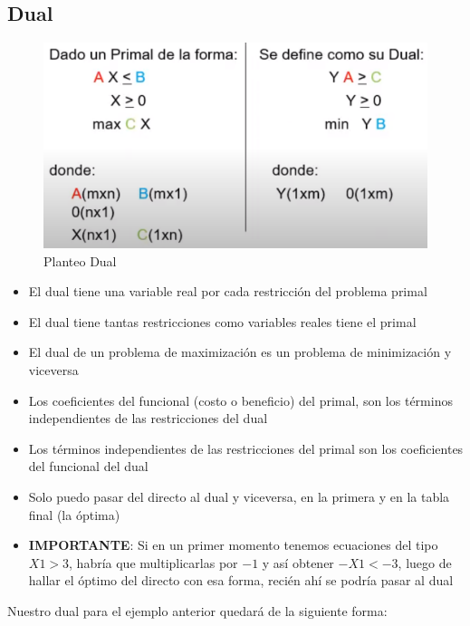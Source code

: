 \documentclass[titlepage,a4paper]{article}
\begin{document}
\subsection{Dual}

\begin{figure}[H]
    \centering
    \includegraphics[scale=0.4]{planteo_dual.png}
    \caption{Planteo Dual}
\end{figure}

\begin{itemize}
    \item El dual tiene una variable real por cada restricción del problema primal
    \item El dual tiene tantas restricciones como variables reales tiene el primal
    \item El dual de un problema de maximización es un problema de minimización y viceversa
    \item Los coeficientes del funcional (costo o beneficio) del primal, son los términos independientes de las restricciones del dual
    \item Los términos independientes de las restricciones del primal son los coeficientes del funcional del dual
    \item Solo puedo pasar del directo al dual y viceversa, en la primera y en la tabla final (la óptima)
    \item \textbf{IMPORTANTE}: Si en un primer momento tenemos ecuaciones del tipo $X1 > 3$, habría que multiplicarlas por $-1$ y así obtener $-X1 < -3$, luego de hallar el óptimo del directo con esa forma, recién ahí se podría pasar al dual
\end{itemize}


Nuestro dual para el ejemplo anterior quedará de la siguiente forma:
\end{document}

